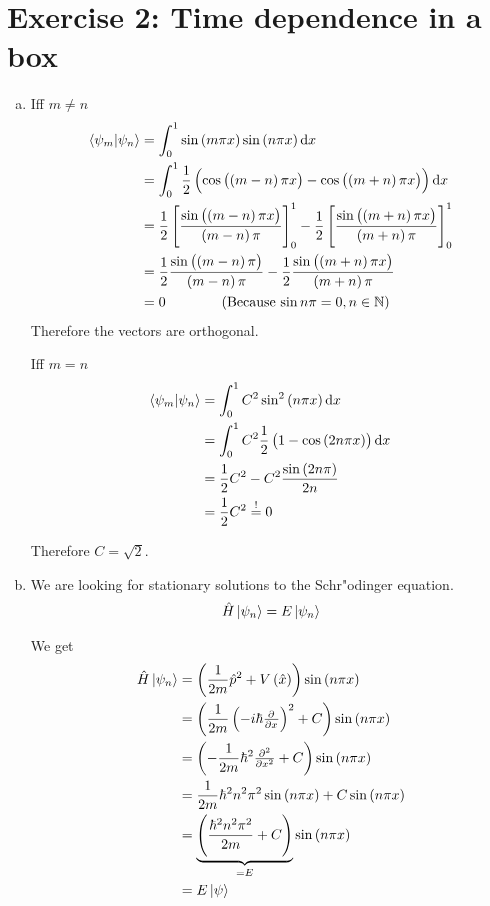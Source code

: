 \documentclass[a4paper,german,12pt,smallheadings]{scrartcl}
\begin{document}
\section*{Exercise 2: Time dependence in a box}
\begin{enumerate}[a)]
  \item
    Iff $m \neq n$
    \begin{align*}
      \braket{\psi_m|\psi_n} &= \int_0^1 \sin\del{m \pi x} \sin\del{n \pi x} \dif x \\
                             &= \int_0^1 \frac{1}{2} \del{\cos\del{\del{m-n}\pi x} - \cos\del{\del{m+n}\pi x}} \dif x \\
                             &= \frac{1}{2} \sbr{\frac{\sin\del{\del{m-n}\pi x}}{\del{m-n} \pi}}_0^1
                                - \frac{1}{2} \sbr{\frac{\sin\del{\del{m+n}\pi x}}{\del{m+n} \pi}}_0^1 \\
                             &= \frac{1}{2} \frac{\sin\del{\del{m-n}\pi}}{\del{m-n} \pi}
                                - \frac{1}{2} \frac{\sin\del{\del{m+n}\pi x}}{\del{m+n} \pi} \\
                             &= 0 \qquad\qquad \text{(Because $\sin n \pi = 0, n \in \mathbb{N}$)}
    \end{align*}
    Therefore the vectors are orthogonal.

    Iff $m = n$
    \begin{align*}
      \braket{\psi_m|\psi_n} &= \int_0^1 C^2 \sin^2\del{n \pi x} \dif x \\
                             &= \int_0^1 C^2 \frac{1}{2}\del{1 - \cos\del{2n \pi x}} \dif x \\
                             &= \frac{1}{2}C^2 - C^2 \frac{\sin\del{2n \pi}}{2n} \\
                             &= \frac{1}{2}C^2 \overset{!}{=} 0
    \end{align*}

    Therefore $C = \sqrt{2}$.
  \item
    We are looking for stationary solutions to the Schr"odinger equation.
    \begin{align*}
      \hat H\ket{\psi_n} = E\ket{\psi_n}
    \end{align*}

    We get
    \begin{align*}
      \hat H\ket{\psi_n} &= \del{\frac{1}{2m} \hat{p}^2 + V\del{\hat{x}}} \sin\del{n \pi x} \\
                         &= \del{\frac{1}{2m} \del{-i\hbar \pd{}{x}}^2 + C} \sin\del{n \pi x} \\
                         &= \del{-\frac{1}{2m} \hbar^2 \pd[2]{}{x} + C} \sin\del{n \pi x} \\
                         &= \frac{1}{2m} \hbar^2 n^2\pi^2 \sin\del{n \pi x} + C \sin\del{n \pi x} \\
                         &= \underbrace{\del{\frac{\hbar^2 n^2 \pi^2}{2m} + C}}_{=E} \sin\del{n \pi x} \\
                         &= E \ket{\psi}
    \end{align*}


\end{enumerate}
\end{document}
